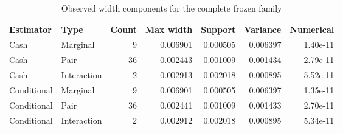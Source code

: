 \begin{table}[htbp]
\centering
\caption{Observed width components for the complete frozen family}\label{tab:precision81}
{\small\setlength{\tabcolsep}{3.5pt}
\begin{tabular}{llrrrrr}
\toprule
Estimator & Type & Count & Max width & Support & Variance & Numerical \\
\midrule
Cash & Marginal & 9 & 0.006901 & 0.000505 & 0.006397 & 1.40e-11 \\
Cash & Pair & 36 & 0.002443 & 0.001009 & 0.001434 & 2.79e-11 \\
Cash & Interaction & 2 & 0.002913 & 0.002018 & 0.000895 & 5.52e-11 \\
Conditional & Marginal & 9 & 0.006901 & 0.000505 & 0.006397 & 1.35e-11 \\
Conditional & Pair & 36 & 0.002441 & 0.001009 & 0.001433 & 2.70e-11 \\
Conditional & Interaction & 2 & 0.002912 & 0.002018 & 0.000895 & 5.34e-11 \\
\bottomrule\end{tabular}}
\par{}
\end{table}
